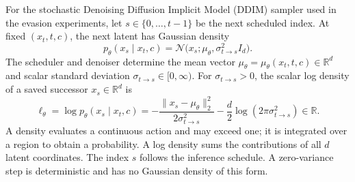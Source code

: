 For the stochastic Denoising Diffusion Implicit Model (DDIM) sampler used in the evasion experiments, let $s\in\{0,\ldots,t-1\}$ be the next scheduled index. At fixed $(x_t,t,c)$, the next latent has Gaussian density
\begin{equation}
\label{eq:ddim-transition}
 p_\theta(x_s\mid x_t,c)=
 \mathcal N\big(x_s;\mu_\theta,\sigma_{t\to s}^2 I_d\big).
\end{equation}
The scheduler and denoiser determine the mean vector $\mu_\theta=\mu_\theta(x_t,t,c)\in\mathbb R^d$ and scalar standard deviation $\sigma_{t\to s}\in[0,\infty)$. For $\sigma_{t\to s}>0$, the scalar log density of a saved successor $x_s\in\mathbb R^d$ is
\begin{equation}
\label{eq:ddim-log-density}
 \ell_\theta=\log p_\theta(x_s\mid x_t,c)
 =-\frac{\|x_s-\mu_\theta\|_2^2}{2\sigma_{t\to s}^2}
   -\frac d2\log(2\pi\sigma_{t\to s}^2)\in\mathbb R.
\end{equation}
A density evaluates a continuous action and may exceed one; it is integrated over a region to obtain a probability. A log density sums the contributions of all $d$ latent coordinates. The index $s$ follows the inference schedule. A zero-variance step is deterministic and has no Gaussian density of this form.
